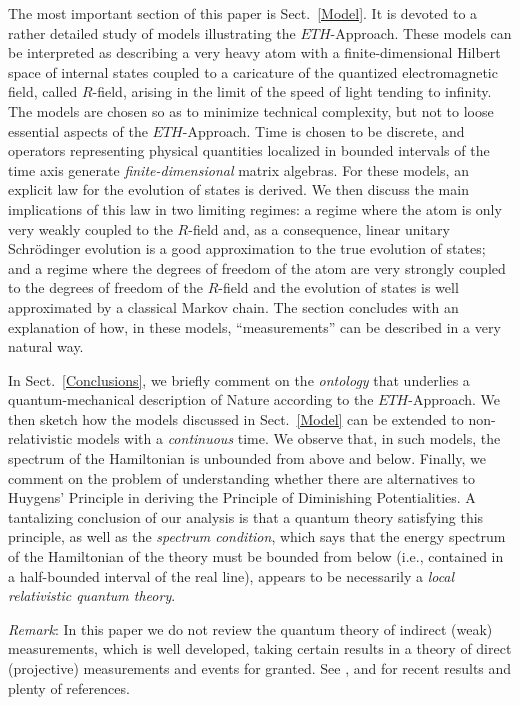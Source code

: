 \documentclass[a4paper,11pt]{article}
\begin{document}
The most important section of this paper is Sect.~\ref{Model}. It is devoted to a rather detailed study of models illustrating 
the $ETH$-Approach. These models can be interpreted as describing a very heavy atom with a finite-dimensional 
Hilbert space of internal states coupled to a caricature of the quantized electromagnetic field, called $R$-field, 
arising in the limit of the speed of light tending to infinity. The models are chosen so as to minimize technical 
complexity, but not to loose essential aspects of the $ETH$-Approach. Time is chosen to be discrete, 
and operators representing physical quantities localized in bounded intervals of the time axis generate 
\textit{finite-dimensional} matrix algebras. For these models, an explicit law for the evolution of states is 
derived. We then discuss the main implications of this law in two limiting regimes: a regime where the atom is only 
very weakly coupled to the $R$-field and, as a consequence, linear unitary Schr\"odinger evolution is a good approximation  
to the true evolution of states; and a regime where the degrees of freedom of the atom are very strongly coupled to the 
degrees of freedom of the $R$-field and the evolution of states is well approximated by a classical Markov chain. 
The section concludes with an explanation of how, in these models, ``measurements'' can be described in a very 
natural way.

In Sect.~\ref{Conclusions}, we briefly comment on the \textit{ontology} that underlies a quantum-mechanical description 
of Nature according to the $ETH$-Approach. We then sketch how the models discussed in Sect.~\ref{Model} can be 
extended to non-relativistic models with a \textit{continuous} time. We observe that, in such models, the spectrum 
of the Hamiltonian is unbounded from above and below. Finally, we comment on the problem of understanding 
whether there are alternatives to Huygens' Principle in deriving the Principle of Diminishing Potentialities. 
A tantalizing conclusion of our analysis is that a quantum theory satisfying this principle, as well as the 
\textit{spectrum condition}, which says that the energy spectrum of the Hamiltonian of the theory must be 
bounded from below (i.e., contained in a half-bounded interval of the real line), appears to be necessarily a 
\textit{local relativistic quantum theory}.

\textit{Remark}: In this paper we do not review the quantum theory of indirect (weak) measurements, which is well developed, 
taking certain results in a theory of direct (projective) measurements and events for granted.
See \cite{M-K}, and \cite{BCJP} for recent  results and plenty of references.
\end{document}

